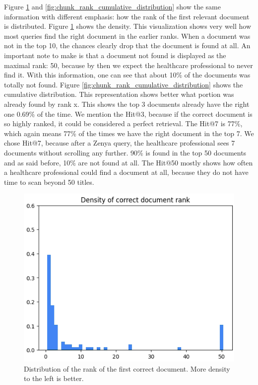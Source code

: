 Figure \ref{fig:chunk_rank_density} and \ref{fig:chunk_rank_cumulative_distribution} show the same information with different emphasis: how the rank of the first relevant document is distributed. Figure \ref{fig:chunk_rank_density} shows the density. This visualization shows very well how most queries find the right document in the earlier ranks. When a document was not in the top 10, the chances clearly drop that the document is found at all. An important note to make is that a document not found is displayed as the maximal rank: 50, because by then we expect the healthcare professional to never find it. With this information, one can see that about 10\% of the documents was totally not found. Figure \ref{fig:chunk_rank_cumulative_distribution} shows the cumulative distribution. This representation shows better what portion was already found by rank x. This shows the top 3 documents already have the right one 0.69\% of the time. We mention the Hit@3, because if the correct document is so highly ranked, it could be considered a perfect retrieval. The Hit@7 is 77\%, which again means 77\% of the times we have the right document in the top 7. We chose Hit@7, because after a Zenya query, the healthcare professional sees 7 documents without scrolling any further. 90\% is found in the top 50 documents and as said before, 10\% are not found at all. The Hit@50 mostly shows how often a healthcare professional could find a document at all, because they do not have time to scan beyond 50 titles.

\begin{figure}[H]
    \captionsetup{justification=centering}
    \centerline{\includegraphics[width=0.7\linewidth]{fig/rag_distribution.png}}
    \caption{Distribution of the rank of the first correct document. More density to the left is better.}
    \label{fig:chunk_rank_density}
\end{figure}

